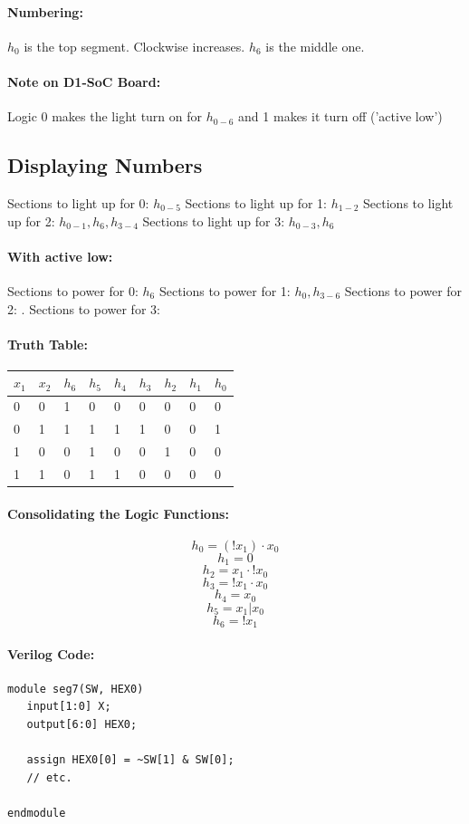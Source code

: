 \documentclass[a4paper,12pt]{report}
\begin{document}
\paragraph{Numbering: } $h_0$ is the top segment. Clockwise increases. $h_6$ is the middle one.

\paragraph{Note on D1-SoC Board: } Logic 0 makes the light turn on for $h_{0-6}$ and 1 makes 
it turn off ('active low')

\subsection{Displaying Numbers}
Sections to light up for 0: $h_{0-5}$
Sections to light up for 1: $h_{1-2}$
Sections to light up for 2: $h_{0-1}, h_6, h_{3-4}$
Sections to light up for 3: $h_{0-3}, h_6$

\paragraph{With active low: }
Sections to power for 0: $h_{6}$
Sections to power for 1: $h_{0}, h_{3-6}$
Sections to power for 2: $.$
Sections to power for 3: 

\paragraph{Truth Table: }
\begin{tabular}{ll|lllllll}
$x_1$ & $x_2$ & $h_6$ & $h_5$ & $h_4$ & $h_3$ & $h_2$ & $h_1$ & $h_0$  \\
\hline
0 & 0 & 1 & 0 & 0 & 0 & 0 & 0 & 0  \\
0 & 1 & 1 & 1 & 1 & 1 & 0 & 0 & 1  \\
1 & 0 & 0 & 1 & 0 & 0 & 1 & 0 & 0  \\
1 & 1 & 0 & 1 & 1 & 0 & 0 & 0 & 0  \\
\end{tabular}

\paragraph{Consolidating the Logic Functions: }
$$h_0 = (!x_1) \cdot x_0$$
$$h_1 = 0$$
$$h_2 = x_1 \cdot !x_0$$
$$h_3 = !x_1 \cdot x_0$$
$$h_4 = x_0$$
$$h_5 = x_1 | x_0$$
$$h_6 = !x_1$$

\paragraph{Verilog Code: }
\begin{lstlisting}
module seg7(SW, HEX0)
   input[1:0] X;
   output[6:0] HEX0;
   
   assign HEX0[0] = ~SW[1] & SW[0];
   // etc.

endmodule
\end{lstlisting}
\end{document}

